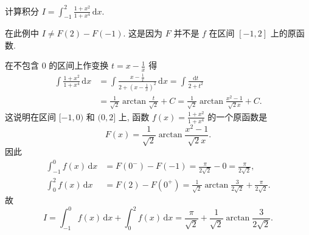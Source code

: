 \documentclass[../../main.tex]{subfiles}%
\begin{document}
\begin{example}
计算积分 $I=\int_{-1}^{2}\frac{1+x^{2}}{1+x^{4}}\,\mathrm{d}x$.
\end{example}
\begin{remark}
在此例中 $I\neq F(2)-F(-1)$. 这是因为 $F$ 并不是 $f$ 在区间 $[-1,2]$ 上的原函数.
\end{remark}
\begin{solution}

在不包含 $0$ 的区间上作变换 $t=x-\frac{1}{x}$ 得
\begin{align*}
\int\frac{1+x^{2}}{1+x^{4}}\,\mathrm{d}x&=\int\frac{x-\frac{1}{x}}{2+\left(x-\frac{1}{x}\right)^{2}}\,\mathrm{d}x=\int\frac{\mathrm{d}t}{2+t^{2}}\\
&=\frac{1}{\sqrt{2}}\arctan\frac{t}{\sqrt{2}}+C=\frac{1}{\sqrt{2}}\arctan\frac{x^{2}-1}{\sqrt{2}x}+C.
\end{align*}
这说明在区间 $[-1,0)$ 和 $(0,2]$ 上, 函数 $f(x)=\frac{1+x^{2}}{1+x^{4}}$ 的一个原函数是
$$F(x)=\frac{1}{\sqrt{2}}\arctan\frac{x^{2}-1}{\sqrt{2}x}.$$
因此
\begin{align*}
\int_{-1}^{0}f(x)\,\mathrm{d}x&=F(0^{-})-F(-1)=\frac{\pi}{2\sqrt{2}}-0=\frac{\pi}{2\sqrt{2}},\\
\int_{0}^{2}f(x)\,\mathrm{d}x&=F(2)-F(0^{+})=\frac{1}{\sqrt{2}}\arctan\frac{3}{2\sqrt{2}}+\frac{\pi}{2\sqrt{2}}.
\end{align*}
故
$$I=\int_{-1}^{0}f(x)\,\mathrm{d}x+\int_{0}^{2}f(x)\,\mathrm{d}x=\frac{\pi}{\sqrt{2}}+\frac{1}{\sqrt{2}}\arctan\frac{3}{2\sqrt{2}}.$$

\end{solution}
\end{document}
